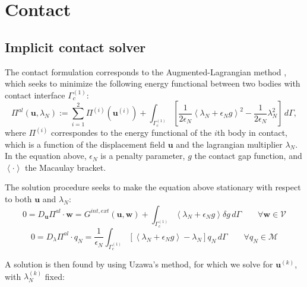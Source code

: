 

\chapter{Contact}

\section{Implicit contact solver}

The contact formulation corresponds to the Augmented-Lagrangian method \cite{Laursen:2002}, which seeks to minimize the following energy functional between two bodies with contact interface $ \Gamma_c^{\left( 1 \right)} $: 
\begin{equation} \label{eq:functinal} 
  \Pi^{al} \left( \boldsymbol u, \lambda_N \right) := \sum_{i=1}^2 \Pi ^{\left( i \right) } ( \boldsymbol u ^{\left( i \right) }  ) + \int_{\Gamma_c^{\left( 1 \right) } } \left[ \frac{1}{2 \epsilon_N } \left< \lambda_N + \epsilon_N g \right>^ 2 - \frac{1}{2 \epsilon_N} \lambda^2_N \right] \, d\Gamma,
\end{equation}
where $ \Pi^{\left( i \right) } $ correspondes to the energy functional of the $ i $th body in contact, which is a function of the displacement field $\boldsymbol u$ and the lagrangian multiplier $\lambda_N$. In the equation above, $\epsilon_N$ is a penalty parameter,  $g$ the contact gap function, and $\left< \cdot \right>$ the Macaulay bracket.

The solution procedure seeks to make the equation above stationary with respect to both $\boldsymbol u$ and $\lambda_N$:
\begin{equation}
 0 = D_{\boldsymbol u} \Pi^{al} \cdot \boldsymbol w = G^{int,ext} \left( \boldsymbol u, \boldsymbol w \right) + \int_{\Gamma_c^{\left( 1 \right) } } \left< \lambda_N + \epsilon_N g \right> \delta g  \, d\Gamma  \qquad  \forall \boldsymbol w \in \mathcal{V}
\end{equation}
\begin{equation}  0 = D_{ \lambda} \Pi^{al} \cdot q_N  = \frac{1}{\epsilon_N} \int_{\Gamma_c^{\left( 1 \right) } } \left[ \left< \lambda_N + \epsilon_N g \right> - \lambda_N \right] q_N  \, d\Gamma  \qquad  \forall q_N \in \mathcal{M}
\end{equation}

A solution is then found by using Uzawa's method, for which we solve for $ \boldsymbol u ^ {\left( k \right) }$, with $ \lambda_N^{\left( k \right)}$ fixed:

